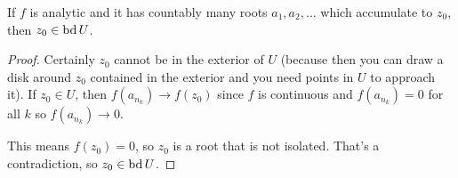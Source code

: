 \documentclass[notes]{subfile}
\begin{document}
\begin{theorem}
    If $f$ is analytic and it has countably many roots 
    $a_1, a_2, \ldots$ which accumulate to $z_0$, then 
    $z_0 \in \operatorname{bd} U$.
\end{theorem}

\begin{proof}
    Certainly $z_0$ cannot be in the exterior of $U$ (because then
    you can draw a disk around $z_0$ contained in the exterior
    and you need points in $U$ to approach it).
    If $z_0 \in U$, then $f(a_{n_k}) \to f(z_0)$ since $f$ is
    continuous and $f(a_{n_k}) = 0$ for all $k$ so $f(a_{n_k})
    \to 0$.

    This means $f(z_0) = 0$, 
    so $z_0$ is a root that is not isolated.
    That's a contradiction, so $z_0 \in \operatorname{bd} U$.
\end{proof}
\end{document}
